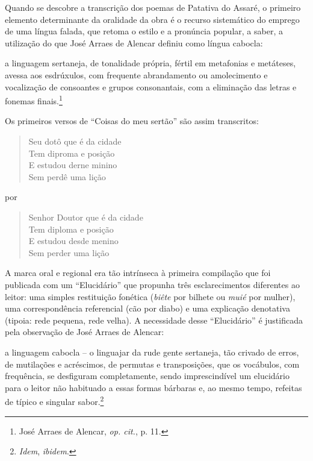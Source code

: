 Quando se descobre a transcrição dos poemas de Patativa do Assaré, o primeiro
elemento determinante da oralidade da obra é o recurso sistemático do emprego de
uma língua falada, que retoma o estilo e a pronúncia popular, a saber, a
utilização do que José Arraes de Alencar definiu como língua cabocla:

\begin{hedraquote}
a linguagem sertaneja, de tonalidade própria, fértil em metafonias e metáteses,
avessa aos esdrúxulos, com frequente abrandamento ou amolecimento e vocalização
de consoantes e grupos consonantais, com a eliminação das letras e fonemas
finais.\footnote{ José Arraes de Alencar, \textit{op. cit.}, p. 11.}
\end{hedraquote}

\noindent Os primeiros versos de “Coisas do meu sertão” são assim transcritos:

\begin{verse}
Seu dotô que é da cidade \\
Tem diproma e posição \\
E estudou derne minino \\
Sem perdê uma lição 
\end{verse}

\noindent por

\begin{verse}
Senhor Doutor que é da cidade\\
Tem diploma e posição\\
E estudou desde menino\\
Sem perder uma lição
\end{verse}

A marca oral e regional era tão intrínseca à primeira compilação que foi
publicada com um “Elucidário” que propunha três esclarecimentos diferentes ao
leitor: uma simples restituição fonética (\textit{biête} por bilhete ou \textit{muié} por mulher),
uma correspondência referencial (cão por diabo) e uma explicação denotativa
(tipoia: rede pequena, rede velha). A necessidade desse “Elucidário” é
justificada pela observação de José Arraes de Alencar:

\begin{hedraquote}
a linguagem cabocla -- o
linguajar da rude gente sertaneja, tão crivado de erros, de mutilações e
acréscimos, de permutas e transposições, que os vocábulos, com frequência, se
desfiguram completamente, sendo imprescindível um elucidário para o leitor não
habituado a essas formas bárbaras e, ao mesmo tempo, refeitas de típico e
singular sabor.\footnote{ \textit{Idem}, \textit{ibidem}.}
\end{hedraquote}

